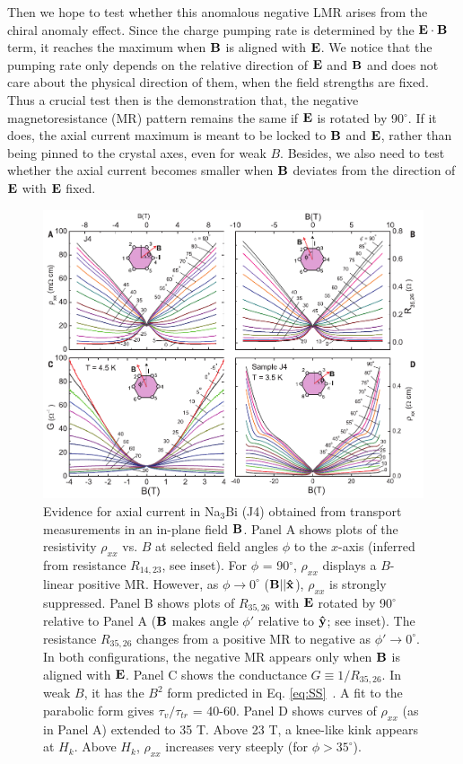 Then we hope to test whether this anomalous negative LMR arises from the chiral anomaly effect. Since the charge pumping rate is determined by the $\bf E\cdot \bf B$ term, it reaches the maximum when $\bf B$ is aligned with $\bf E$. We notice that the pumping rate only depends on the relative direction of $\bf E$ and $\bf B$ and does not care about the physical direction of them, when the field strengths are fixed. Thus a crucial test then is the demonstration that, the negative magnetoresistance (MR) pattern remains the same if $\bf E$ is rotated by 90$^\circ$. If it does, the axial current maximum is meant to be locked to $\bf B$ and $\bf E$, rather than being pinned to the crystal axes, even for weak $B$. Besides, we also need to test whether the axial current becomes smaller when $\bf B$ deviates from the direction of $\bf E$ with $\bf E$ fixed.

\begin{figure}[!htbp]
  \begin{center}
\includegraphics[width=1\linewidth]{ch-na3bi/figures/FigMR4.pdf}
\caption{\label{figMR4}
Evidence for axial current in Na$_3$Bi (J4) obtained from transport measurements in an in-plane field $\bf B$. Panel A shows plots of the resistivity $\rho_{xx}$ vs. $B$ at selected field angles $\phi$ to the $x$-axis (inferred from resistance $R_{14,23}$, see inset). For $\phi$ = 90$^\circ$, $\rho_{xx}$ displays a $B$-linear positive MR. However, as $\phi\to 0^\circ$ ($\bf B||\hat{x}$), $\rho_{xx}$ is strongly suppressed. Panel B shows plots of $R_{35,26}$ with $\bf E$ rotated by 90$^\circ$ relative to Panel A ($\bf B$ makes angle $\phi'$ relative to $\bf\hat{y}$; see inset). The resistance $R_{35,26}$ changes from a positive MR to negative as $\phi'\to 0^\circ$. In both configurations, the negative MR appears only when $\bf B$ is aligned with $\bf E$. Panel C shows the conductance $G\equiv 1/R_{35,26}$. In weak $B$, it has the $B^2$ form predicted in Eq. \ref{eq:SS}~\cite{Son2013}. A fit to the parabolic form gives $\tau_v/\tau_{tr}$ = 40-60. Panel D shows curves of $\rho_{xx}$ (as in Panel A) extended to 35 T. Above 23 T, a knee-like kink appears at $H_k$. Above $H_k$, $\rho_{xx}$ increases very steeply (for $\phi >35^\circ$).}
  \end{center}
\end{figure}


